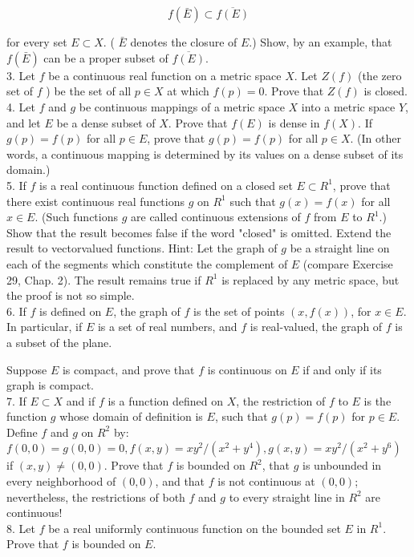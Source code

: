 \documentclass[10pt]{article}
\begin{document}
$$
f(\bar{E}) \subset \overline{f(E)}
$$

for every set $E \subset X$. ( $\bar{E}$ denotes the closure of $E$.) Show, by an example, that $f(\bar{E})$ can be a proper subset of $\overline{f(E)}$.\\
3. Let $f$ be a continuous real function on a metric space $X$. Let $Z(f)$ (the zero set of $f$ ) be the set of all $p \in X$ at which $f(p)=0$. Prove that $Z(f)$ is closed.\\
4. Let $f$ and $g$ be continuous mappings of a metric space $X$ into a metric space $Y$,\\
and let $E$ be a dense subset of $X$. Prove that $f(E)$ is dense in $f(X)$. If $g(p)=f(p)$ for all $p \in E$, prove that $g(p)=f(p)$ for all $p \in X$. (In other words, a continuous mapping is determined by its values on a dense subset of its domain.)\\
5. If $f$ is a real continuous function defined on a closed set $E \subset R^{1}$, prove that there exist continuous real functions $g$ on $R^{1}$ such that $g(x)=f(x)$ for all $x \in E$. (Such functions $g$ are called continuous extensions of $f$ from $E$ to $R^{1}$.) Show that the result becomes false if the word "closed" is omitted. Extend the result to vectorvalued functions. Hint: Let the graph of $g$ be a straight line on each of the segments which constitute the complement of $E$ (compare Exercise 29, Chap. 2). The result remains true if $R^{1}$ is replaced by any metric space, but the proof is not so simple.\\
6. If $f$ is defined on $E$, the graph of $f$ is the set of points $(x, f(x))$, for $x \in E$. In particular, if $E$ is a set of real numbers, and $f$ is real-valued, the graph of $f$ is a subset of the plane.

Suppose $E$ is compact, and prove that $f$ is continuous on $E$ if and only if its graph is compact.\\
7. If $E \subset X$ and if $f$ is a function defined on $X$, the restriction of $f$ to $E$ is the function $g$ whose domain of definition is $E$, such that $g(p)=f(p)$ for $p \in E$. Define $f$ and $g$ on $R^{2}$ by: $f(0,0)=g(0,0)=0, f(x, y)=x y^{2} /\left(x^{2}+y^{4}\right), g(x, y)=x y^{2} /\left(x^{2}+y^{6}\right)$ if $(x, y) \neq(0,0)$. Prove that $f$ is bounded on $R^{2}$, that $g$ is unbounded in every neighborhood of $(0,0)$, and that $f$ is not continuous at $(0,0)$; nevertheless, the restrictions of both $f$ and $g$ to every straight line in $R^{2}$ are continuous!\\
8. Let $f$ be a real uniformly continuous function on the bounded set $E$ in $R^{1}$. Prove that $f$ is bounded on $E$.
\end{document}

